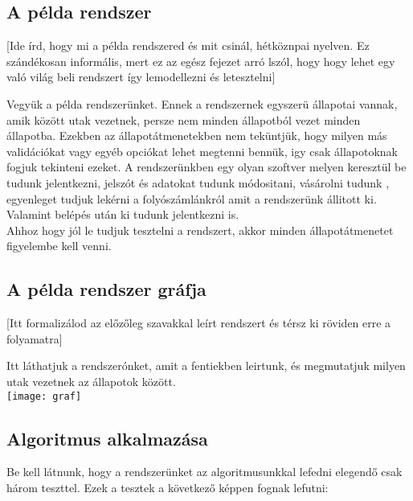 \documentclass[12pt]{article}
\begin{document}
\subsection{A példa rendszer}
[Ide írd, hogy mi a példa rendszered és mit csinál, hétköznpai nyelven. Ez szándékosan informális, mert ez az egész fejezet arró lszól, hogy hogy lehet egy való világ beli rendszert így lemodellezni és letesztelni]

Vegyük a példa rendszerünket. Ennek a rendszernek egyszerü állapotai vannak, amik között utak vezetnek, persze nem minden állapotból vezet minden állapotba.
Ezekben az állapotátmenetekben nem teküntjük, hogy milyen más validációkat vagy egyéb opciókat lehet megtenni bennük, igy csak állapotoknak fogjuk tekinteni ezeket.
A rendszerünkben egy olyan szoftver melyen keresztül be tudunk jelentkezni, jelszót és adatokat tudunk módositani, vásárolni tudunk , egyenleget tudjuk lekérni a folyószámlánkról amit a rendszerünk állitott ki. Valamint belépés után ki tudunk jelentkezni is.\\



Ahhoz hogy jól le tudjuk tesztelni a rendszert, akkor minden állapotátmenetet figyelembe kell venni.

\subsection{A példa rendszer gráfja}
[Itt formalizálod az előzőleg szavakkal leírt rendszert és térsz ki röviden erre a folyamatra]

Itt láthatjuk a rendszerónket, amit a fentiekben leirtunk, és megmutatjuk milyen utak vezetnek az állapotok között.\\

\texttt{[image: graf]}

\subsection{Algoritmus alkalmazása}

Be kell látnunk, hogy a rendszerünket az algoritmusunkkal lefedni elegendő csak három teszttel.
Ezek a tesztek a következő képpen fognak lefutni:
\end{document}
